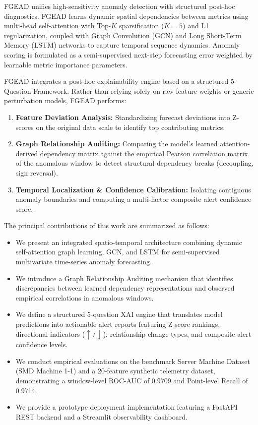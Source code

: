 \documentclass[conference]{IEEEtran}
\begin{document}
FGEAD unifies high-sensitivity anomaly detection with structured post-hoc diagnostics. FGEAD learns dynamic spatial dependencies between metrics using multi-head self-attention with Top-$K$ sparsification ($K=5$) and L1 regularization, coupled with Graph Convolution (GCN) and Long Short-Term Memory (LSTM) networks to capture temporal sequence dynamics. Anomaly scoring is formulated as a semi-supervised next-step forecasting error weighted by learnable metric importance parameters.

FGEAD integrates a post-hoc explainability engine based on a structured 5-Question Framework. Rather than relying solely on raw feature weights or generic perturbation models, FGEAD performs:
\begin{enumerate}
    \item \textbf{Feature Deviation Analysis:} Standardizing forecast deviations into Z-scores on the original data scale to identify top contributing metrics.
    \item \textbf{Graph Relationship Auditing:} Comparing the model's learned attention-derived dependency matrix against the empirical Pearson correlation matrix of the anomalous window to detect structural dependency breaks (decoupling, sign reversal).
    \item \textbf{Temporal Localization \& Confidence Calibration:} Isolating contiguous anomaly boundaries and computing a multi-factor composite alert confidence score.
\end{enumerate}

The principal contributions of this work are summarized as follows:
\begin{itemize}
    \item We present an integrated spatio-temporal architecture combining dynamic self-attention graph learning, GCN, and LSTM for semi-supervised multivariate time-series anomaly forecasting.
    \item We introduce a Graph Relationship Auditing mechanism that identifies discrepancies between learned dependency representations and observed empirical correlations in anomalous windows.
    \item We define a structured 5-question XAI engine that translates model predictions into actionable alert reports featuring Z-score rankings, directional indicators ($\uparrow/\downarrow$), relationship change types, and composite alert confidence levels.
    \item We conduct empirical evaluations on the benchmark Server Machine Dataset (SMD Machine 1-1) and a 20-feature synthetic telemetry dataset, demonstrating a window-level ROC-AUC of 0.9709 and Point-level Recall of 0.9714.
    \item We provide a prototype deployment implementation featuring a FastAPI REST backend and a Streamlit observability dashboard.
\end{itemize}
\end{document}
